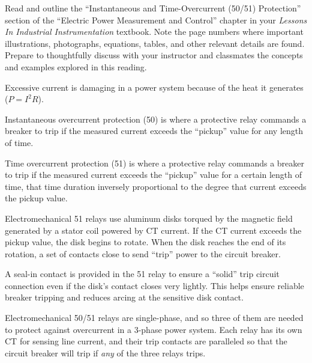 

Read and outline the ``Instantaneous and Time-Overcurrent (50/51) Protection'' section of the ``Electric Power Measurement and Control'' chapter in your {\it Lessons In Industrial Instrumentation} textbook.  Note the page numbers where important illustrations, photographs, equations, tables, and other relevant details are found.  Prepare to thoughtfully discuss with your instructor and classmates the concepts and examples explored in this reading.













Excessive current is damaging in a power system because of the heat it generates ($P = I^2 R$).

\vskip 10pt

Instantaneous overcurrent protection (50) is where a protective relay commands a breaker to trip if the measured current exceeds the ``pickup'' value for any length of time.

\vskip 10pt

Time overcurrent protection (51) is where a protective relay commands a breaker to trip if the measured current exceeds the ``pickup'' value for a certain length of time, that time duration inversely proportional to the degree that current exceeds the pickup value.

Electromechanical 51 relays use aluminum disks torqued by the magnetic field generated by a stator coil powered by CT current.  If the CT current exceeds the pickup value, the disk begins to rotate.  When the disk reaches the end of its rotation, a set of contacts close to send ``trip'' power to the circuit breaker.

A seal-in contact is provided in the 51 relay to ensure a ``solid'' trip circuit connection even if the disk's contact closes very lightly.  This helps ensure reliable breaker tripping and reduces arcing at the sensitive disk contact.

\vskip 10pt

Electromechanical 50/51 relays are single-phase, and so three of them are needed to protect against overcurrent in a 3-phase power system.  Each relay has its own CT for sensing line current, and their trip contacts are paralleled so that the circuit breaker will trip if {\it any} of the three relays trips.

